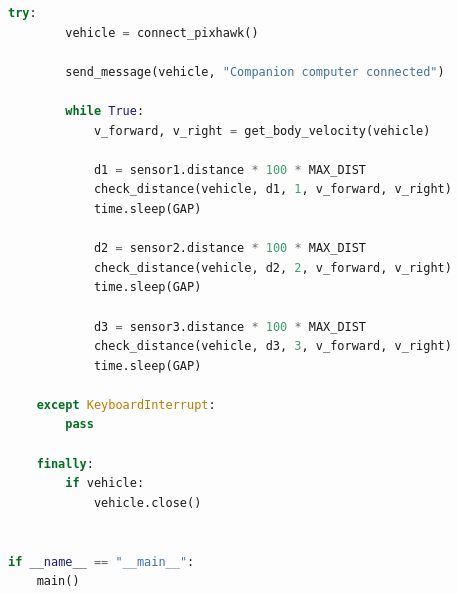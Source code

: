 \documentclass[a4paper,12pt]{book}
\begin{document}
\begin{lstlisting}[language=python, caption={Program ostrzegający o wykrytych przez czujniki przeszkodach}, label={lst:program1}]
    try:
        vehicle = connect_pixhawk()

        send_message(vehicle, "Companion computer connected")

        while True:
            v_forward, v_right = get_body_velocity(vehicle)

            d1 = sensor1.distance * 100 * MAX_DIST
            check_distance(vehicle, d1, 1, v_forward, v_right)
            time.sleep(GAP)

            d2 = sensor2.distance * 100 * MAX_DIST
            check_distance(vehicle, d2, 2, v_forward, v_right)
            time.sleep(GAP)

            d3 = sensor3.distance * 100 * MAX_DIST
            check_distance(vehicle, d3, 3, v_forward, v_right)
            time.sleep(GAP)

    except KeyboardInterrupt:
        pass

    finally:
        if vehicle:
            vehicle.close()


if __name__ == "__main__":
    main()
        \end{lstlisting}
\end{document}
